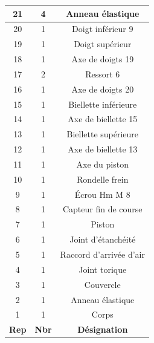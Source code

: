\documentclass[10pt,fleqn]{article} %
\begin{document}
\begin{multicols}{2}
\begin{center}
\begin{tabular}{|c|c|c|}
\hline
21	&4&	Anneau élastique	 \\ \hline
20	&1&	Doigt inférieur	9	 \\ \hline
19	&1&	Doigt supérieur	 \\ \hline
18	&1&	Axe de doigts 19	 \\ \hline
17	&2&	Ressort	6 \\ \hline
16	&1&	Axe de doigts 20 \\ \hline
15	&1&	Biellette inférieure	 \\ \hline
14	&1&	Axe de biellette 15	 \\ \hline
13	&1&	Biellette supérieure	 \\ \hline
12	&1&	Axe de biellette 13	 \\ \hline
11	&1&	Axe du piston \\ \hline
10	&1&	Rondelle frein \\ \hline
9	&1&	Écrou Hm M 8 \\ \hline
8	&1&	Capteur fin de course \\ \hline
7	&1&	Piston \\ \hline
6	&1&	Joint d’étanchéité \\ \hline
5	&1&	Raccord d’arrivée d’air \\ \hline
4	&1&	Joint torique \\ \hline
3	&1&	Couvercle \\ \hline
2	&1&	Anneau élastique \\ \hline
1	&1&	Corps \\ \hline
\hline
\textbf{Rep} & \textbf{Nbr} & \textbf{Désignation} \\ \hline
\end{tabular}
\end{center}


\end{multicols}
\end{document}
